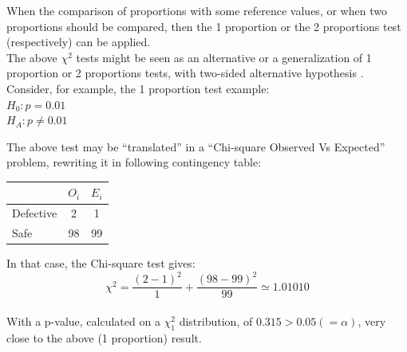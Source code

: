 
\begin{frame}
  \vspace{.5cm}
  When the comparison of proportions with some reference values, or when two proportions should be compared, then the 1 proportion or the 2 proportions test (respectively) can be applied.\\
  \vspace{.75cm}
  The above $\chi^2$ tests might be seen as an alternative or a generalization of 1 proportion or 2 proportions tests, with two-sided alternative hypothesis .\\
  \vspace{.75cm}
  Consider, for example, the 1 proportion test example:\\
  $H_0: p=0.01$\\
  $H_A: p\neq 0.01$\\
  \vspace{.25cm}
\end{frame}

\begin{frame}
  \vspace{.25cm}
  The above test may be ``translated'' in a ``Chi-square Observed Vs Expected'' problem, rewriting it in following contingency table:
  \vspace{.25cm}
  \begin{center}
  \begin{tabular}{l|c|c}
  & $O_i$ & $E_i$\\
  \hline
  Defective & 2 & 1\\
  Safe & 98 & 99\\
  \hline
  \end{tabular}
  \end{center}
  \vspace{.25cm}
  In that case, the Chi-square test gives:\\
  \vspace{.25cm}
  $$\chi^2=\dfrac{(2-1)^2}{1}+\dfrac{(98-99)^2}{99}\simeq 1.01010$$\\
  \vspace{.25cm}
  With a p-value, calculated on a $\chi^2_1$ distribution, of $0.315 > 0.05 (=\alpha)$, very close to the above (1 proportion) result.
\end{frame}

